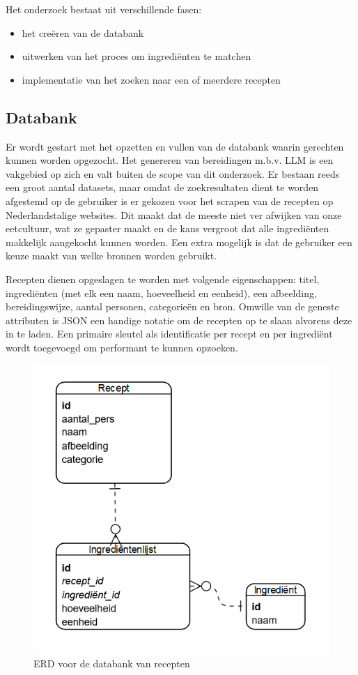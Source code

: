 \documentclass{hogent-article}
\begin{document}

Het onderzoek bestaat uit verschillende fasen:
\begin{itemize}
    \item het creëren van de databank
    \item uitwerken van het proces om ingrediënten te matchen
    \item implementatie van het zoeken naar een of meerdere recepten
\end{itemize}

\subsection{Databank}%

Er wordt gestart met het opzetten en vullen van de databank waarin gerechten kunnen worden opgezocht. Het genereren van bereidingen m.b.v. LLM is een vakgebied op zich en valt buiten de scope van dit onderzoek. Er bestaan reeds een groot aantal datasets, maar omdat de zoekresultaten dient te worden afgestemd op de gebruiker is er gekozen voor het scrapen van de recepten op Nederlandstalige websites. Dit maakt dat de meeste niet ver afwijken van onze eetcultuur, wat ze gepaster maakt en de kans vergroot dat alle ingrediënten makkelijk aangekocht kunnen worden. Een extra mogelijk is dat de gebruiker een keuze maakt van welke bronnen worden gebruikt.

Recepten dienen opgeslagen te worden met volgende eigenschappen: titel, ingrediënten (met elk een naam, hoeveelheid en eenheid), een afbeelding, bereidingswijze, aantal personen, categorieën en bron. Omwille van de geneste attributen is JSON een handige notatie om de recepten op te slaan alvorens deze in te laden. Een primaire sleutel als identificatie per recept en per ingrediënt wordt toegevoegd om performant te kunnen opzoeken. \begin{figure}
    \centering
    \includegraphics[width=0.7\linewidth]{../ERD}
    \caption[ERD Databank]{ERD voor de databank van recepten}
    \label{fig:erd}
\end{figure}
\end{document}

